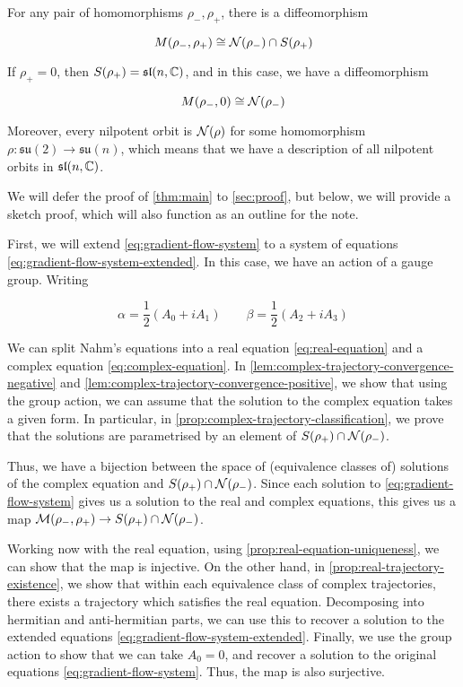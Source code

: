 \documentclass{report}
\newcommand{\su}{\mathfrak{su}}
\renewcommand{\sl}{\mathfrak{sl}}
\begin{document}
\begin{theorem}
    \label{thm:main}

    For any pair of homomorphisms \(\rho_-, \rho_+\), there is a diffeomorphism

    \[M(\rho_-, \rho_+) \cong \mathcal{N}(\rho_-) \cap S(\rho_+)\]
\end{theorem}

If \(\rho_+ = 0\), then \(S(\rho_+) = \sl(n, \C)\), and in this case, we have a diffeomorphism

\[M(\rho_-, 0) \cong \mathcal{N}(\rho_-)\]

Moreover, every nilpotent orbit is \(\mathcal{N}(\rho)\) for some homomorphism \(\rho : \su(2) \to \su(n)\), which means that we have a description of all nilpotent orbits in \(\sl(n, \C)\).

We will defer the proof of \cref{thm:main} to \cref{sec:proof}, but below, we will provide a sketch proof, which will also function as an outline for the note.

First, we will extend \cref{eq:gradient-flow-system} to a system of equations \cref{eq:gradient-flow-system-extended}. In this case, we have an action of a gauge group. Writing

\[\alpha = \frac{1}{2}(A_0 + iA_1) \qquad \beta = \frac12(A_2 + iA_3)\]

We can split Nahm's equations into a real equation \cref{eq:real-equation} and a complex equation \cref{eq:complex-equation}. In \cref{lem:complex-trajectory-convergence-negative} and \cref{lem:complex-trajectory-convergence-positive}, we show that using the group action, we can assume that the solution to the complex equation takes a given form. In particular, in \cref{prop:complex-trajectory-classification}, we prove that the solutions are parametrised by an element of \(S(\rho_+) \cap \mathcal{N}(\rho_-)\).

Thus, we have a bijection between the space of (equivalence classes of) solutions of the complex equation and \(S(\rho_+) \cap \mathcal{N}(\rho_-)\). Since each solution to \cref{eq:gradient-flow-system} gives us a solution to the real and complex equations, this gives us a map \(\mathcal{M}(\rho_-, \rho_+) \to S(\rho_+) \cap \mathcal{N}(\rho_-)\).

Working now with the real equation, using \cref{prop:real-equation-uniqueness}, we can show that the map is injective. On the other hand, in \cref{prop:real-trajectory-existence}, we show that within each equivalence class of complex trajectories, there exists a trajectory which satisfies the real equation. Decomposing into hermitian and anti-hermitian parts, we can use this to recover a solution to the extended equations \cref{eq:gradient-flow-system-extended}. Finally, we use the group action to show that we can take \(A_0 = 0\), and recover a solution to the original equations \cref{eq:gradient-flow-system}. Thus, the map is also surjective.
\end{document}
